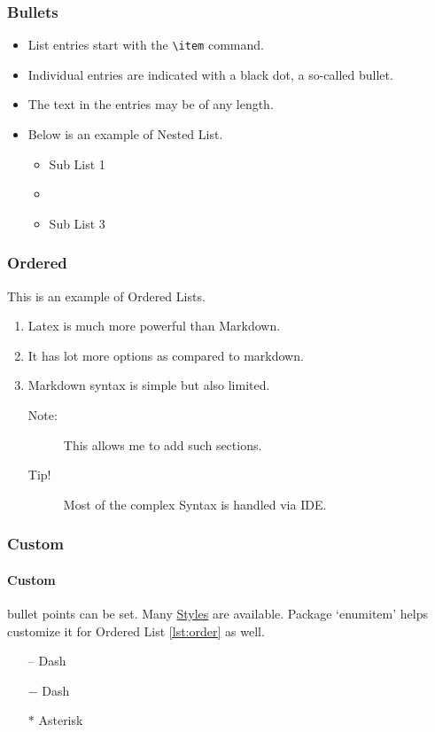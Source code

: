 \documentclass{report}[a4paper,12pt] %
\begin{document}
\subsubsection{Bullets}
\begin{itemize}
  \label{lst:bullet}
  \item List entries start with the \verb|\item| command.
  \item Individual entries are indicated with a black dot, a so-called bullet.
  \item The text in the entries may be of any length.
  \item Below is an example of Nested List.
  \begin{itemize}
    \item Sub List 1
    \item \lipsum[1]
    \item Sub List 3
  \end{itemize}
\end{itemize}

\subsubsection{Ordered}
This is an example of Ordered Lists.

\begin{enumerate}[label=(\roman*)]
  \label{lst:order}
  \item Latex is much more powerful than Markdown.
  \item It has lot more options as compared to markdown.
  \item Markdown syntax is simple but also limited.
  \begin{description}
    \item[Note:] This allows me to add such sections.
    \item[Tip!] Most of the complex Syntax is handled via IDE.
  \end{description}
\end{enumerate}

\subsubsection{Custom}
\paragraph{Custom} bullet points can be set. Many \href{https://latex-tutorial.com/bullet-styles/}{Styles} are available.
Package `enumitem' helps customize it for Ordered List \ref{lst:order} as well.
\begin{itemize}
  \label{lst:format}
  \item[--] Dash
  \item[$-$] Dash
  \item[$\ast$] Asterisk
\end{itemize}
\end{document}
